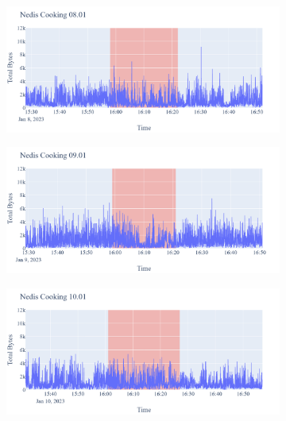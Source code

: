 \begin{figure}[H]
    \begin{subfigure}[b]{0.5\textwidth}
        \centering
        \includegraphics[width=1.2\hsize]{figures/Nedis_Cooking_Bytes_08.01.png}
    \end{subfigure}
    \begin{subfigure}[b]{0.5\textwidth}
        \centering
        \includegraphics[width=1.2\hsize]{figures/Nedis_Cooking_Bytes_09.01.png}
    \end{subfigure}
    \begin{subfigure}[b]{0.5\textwidth}
        \centering
        \includegraphics[width=1.2\hsize]{figures/Nedis_Cooking_Bytes_10.01.png}
    \end{subfigure}
    \begin{subfigure}[b]{0.5\textwidth}

\end{subfigure}
\end{figure}
